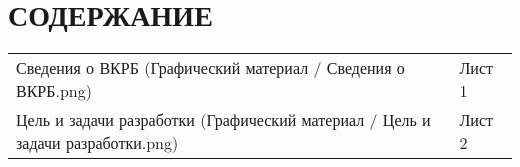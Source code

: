 \newpage
\section*{СОДЕРЖАНИЕ}
\tableofcontents
{\parindent0pt
\begin{tabular}{p{0.88\linewidth}p{0.18\linewidth}}
Сведения о ВКРБ (Графический материал / Сведения о
ВКРБ.png) & Лист 1\\
Цель и задачи разработки (Графический материал / Цель
и задачи разработки.png) & Лист 2\\
\end{tabular}
}

